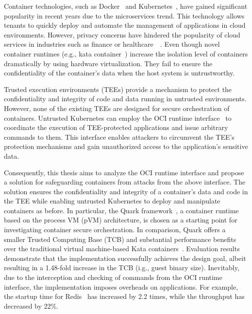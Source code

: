 




Container technologies, such as Docker~\cite*{docker} and Kubernetes~\cite*{k8s}, have gained significant popularity in recent years due to the microservices trend. This technology allows tenants to quickly deploy and automate the management of applications in cloud environments. However, privacy concerns 
have hindered the popularity of cloud services in industries such as finance or healthcare~\cite*{data_privacy}~\cite*{eu_data_Privacy}. Even though novel container runtimes (e.g., kata container~\cite*{Kata-Containers}) increase the isolation level of containers dramatically by using hardware virtualization. 
They fail to ensure the confidentiality of the container's data when the host system is untrustworthy.

Trusted execution environments (\acrshort{TEE}s) provide a mechanism to protect the confidentiality and integrity of code and data running in untrusted environments. However, none of the existing TEEs are designed for secure orchestration of containers. Untrusted Kubernetes\cite*{k8s} can 
employ the OCI runtime interface~\cite*{oci-runtime-spec} to coordinate the execution of TEE-protected applications and issue arbitrary commands to them. This interface enables attackers to circumvent the TEE's protection mechanisms and gain unauthorized access to 
the application's sensitive data.

Consequently, this thesis aims to analyze the OCI runtime interface and propose a solution for safeguarding containers from attacks from the above interface. The solution ensures the confidentiality and integrity of a container's data and code in the TEE while 
enabling untrusted Kubernetes\cite*{k8s} to deploy and manipulate containers as before. In particular, the Quark framework~\cite*{quark}, a container runtime based on the process VM (\acrshort{pVM}) architecture, is chosen as a starting point for investigating container secure orchestration. 
In comparison, Quark offers a smaller Trusted Computing Base (\acrshort{TCB}) and substantial performance benefits over the traditional virtual machine-based Kata containers~\cite*{quark_performance_report}. Evaluation results demonstrate that the implementation successfully achieves the design goal, albeit 
resulting in a 1.48-fold increase in the \acrshort{TCB} (i.g., guest binary size). Inevitably, due to the interception and checking of commands from the OCI runtime interface, the implementation imposes overheads on applications.  For example, the startup time for Redis~\cite*{redis} has 
increased by 2.2 times, while the throughput has decreased by 22\%.



